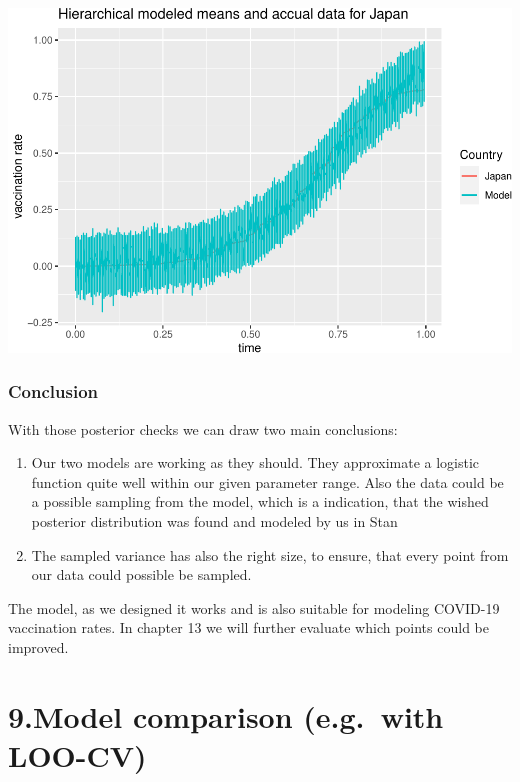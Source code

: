 \documentclass[
]{article}
\begin{document}
\includegraphics{bda_project_files/figure-latex/unnamed-chunk-34-1.pdf}

\hypertarget{conclusion}{%
\subsubsection{Conclusion}\label{conclusion}}

With those posterior checks we can draw two main conclusions:

\begin{enumerate}
\def\labelenumi{\arabic{enumi}.}
\item
  Our two models are working as they should. They approximate a logistic
  function quite well within our given parameter range. Also the data
  could be a possible sampling from the model, which is a indication,
  that the wished posterior distribution was found and modeled by us in
  Stan
\item
  The sampled variance has also the right size, to ensure, that every
  point from our data could possible be sampled.
\end{enumerate}

The model, as we designed it works and is also suitable for modeling
COVID-19 vaccination rates. In chapter 13 we will further evaluate which
points could be improved.

\newpage

\hypertarget{model-comparison-e.g.-with-loo-cv}{%
\section{9.Model comparison (e.g.~with
LOO-CV)}\label{model-comparison-e.g.-with-loo-cv}}
\end{document}
